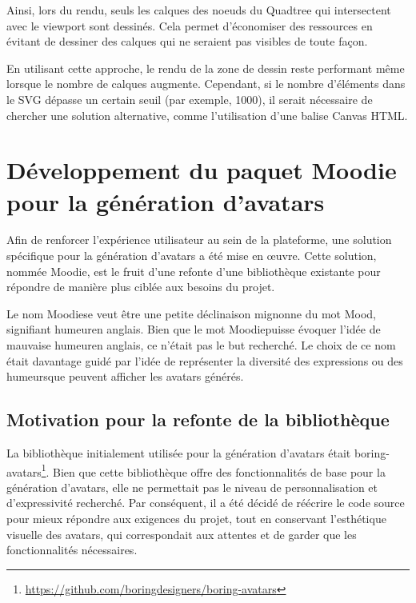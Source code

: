 Ainsi, lors du rendu, seuls les calques des noeuds du Quadtree qui intersectent avec le viewport sont dessinés. Cela permet d'économiser des ressources en évitant de dessiner des calques qui ne seraient pas visibles de toute façon.

En utilisant cette approche, le rendu de la zone de dessin reste performant même lorsque le nombre de calques augmente. Cependant, si le nombre d'éléments dans le SVG dépasse un certain seuil (par exemple, 1000), il serait nécessaire de chercher une solution alternative, comme l'utilisation d'une balise Canvas HTML.

\section{Développement du paquet Moodie pour la génération d'avatars\label{moodie}}

Afin de renforcer l'expérience utilisateur au sein de la plateforme, une solution spécifique pour la génération d'avatars a été mise en \oe{}uvre. Cette solution, nommée \guillemotleft Moodie\guillemotright, est le fruit d'une refonte d'une bibliothèque existante pour répondre de manière plus ciblée aux besoins du projet.

Le nom \guillemotleft Moodie\guillemotright se veut être une petite déclinaison mignonne du mot \guillemotleft Mood\guillemotright, signifiant \guillemotleft humeur\guillemotright en anglais. Bien que le mot \guillemotleft Moodie\guillemotright puisse évoquer l'idée de \guillemotleft mauvaise humeur\guillemotright en anglais, ce n'était pas le but recherché. Le choix de ce nom était davantage guidé par l'idée de représenter la diversité des expressions ou des \guillemotleft humeurs\guillemotright que peuvent afficher les avatars générés.

\subsection{Motivation pour la refonte de la bibliothèque}

La bibliothèque initialement utilisée pour la génération d'avatars était boring-avatars\footnote{\url{https://github.com/boringdesigners/boring-avatars}}. Bien que cette bibliothèque offre des fonctionnalités de base pour la génération d'avatars, elle ne permettait pas le niveau de personnalisation et d'expressivité recherché. Par conséquent, il a été décidé de réécrire le code source pour mieux répondre aux exigences du projet, tout en conservant l'esthétique visuelle des avatars, qui correspondait aux attentes et de garder que les fonctionnalités nécessaires.

